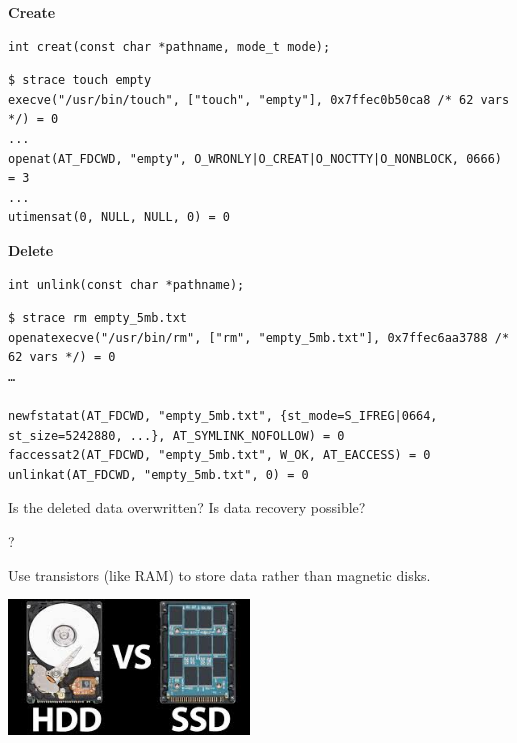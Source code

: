 \begin{slide}


    \textbf{Create}
    
    \begin{verbatim}
int creat(const char *pathname, mode_t mode);
    \end{verbatim}
    \bigskip

	\begin{verbatim}
$ strace touch empty
execve("/usr/bin/touch", ["touch", "empty"], 0x7ffec0b50ca8 /* 62 vars */) = 0
...
openat(AT_FDCWD, "empty", O_WRONLY|O_CREAT|O_NOCTTY|O_NONBLOCK, 0666) = 3
...
utimensat(0, NULL, NULL, 0) = 0
	\end{verbatim}

\end{slide}

\begin{slide}


    \textbf{Delete}
    \begin{verbatim}
int unlink(const char *pathname);
    \end{verbatim}
	\medskip

	\begin{verbatim}
$ strace rm empty_5mb.txt
openatexecve("/usr/bin/rm", ["rm", "empty_5mb.txt"], 0x7ffec6aa3788 /* 62 vars */) = 0
…

newfstatat(AT_FDCWD, "empty_5mb.txt", {st_mode=S_IFREG|0664, st_size=5242880, ...}, AT_SYMLINK_NOFOLLOW) = 0
faccessat2(AT_FDCWD, "empty_5mb.txt", W_OK, AT_EACCESS) = 0
unlinkat(AT_FDCWD, "empty_5mb.txt", 0) = 0
	\end{verbatim}

    \bigskip
    Is the deleted data overwritten?
    Is data recovery possible?
\end{slide}

\begin{slide}
    ?

    Use transistors (like RAM) to store data rather than magnetic disks.
    \bigskip

    \includegraphics[width=64mm]{ssd-hdd.jpg}

\end{slide}

